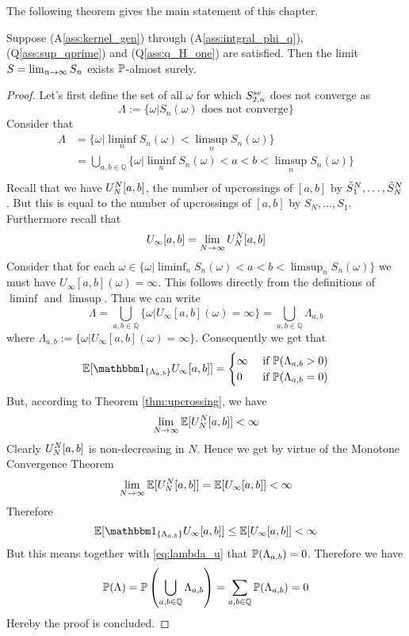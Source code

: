 The following theorem gives the main statement of this chapter. 
\begin{thm}
	\label{thm:existence_limit}
	Suppose (A\ref{ass:kernel_gen}) through (A\ref{ass:intgral_phi_q}), (Q\ref{ass:sup_qprime}) and (Q\ref{ass:q_H_one}) are satisfied. Then the limit
	$S = \lim_{n\to\infty} \sn{n}$
	exists $\P$-almost surely.
	\begin{proof}
		Let's first define the set of all $\omega$ for which $\snse{2}{n}$ does not converge as
		$$\Lambda := \{\omega | S_n(\omega) \textrm{ does not converge}\}$$
		Consider that
		\begin{align*}
			\Lambda &= \{\omega | \liminf_{n}S_n(\omega) < \limsup_{n} S_n(\omega)\}\\
			&= \bigcup_{a,b\in\mathbb{Q}}\{\omega | \liminf_{n}S_n(\omega) < a < b < \limsup_{n} S_n(\omega)\}\\
		\end{align*}
		Recall that we have $\UNab{N}$, the number of upcrossings of $[a,b]$ by $\StN{1}, \dots, \StN{N}$. But this is equal to the number of upcrossings of $[a,b]$ by $S_N, \dots, S_1$. Furthermore recall that 
		$$U_\infty[a,b] = \lim\limits_{N\to\infty} \UNab{N}$$
		Consider that for each $\omega \in \{\omega | \liminf_{n}S_n(\omega) < a < b < \limsup_{n} S_n(\omega)\}$ we must have $U_{\infty}[a,b](\omega) = \infty$. This follows directly from the definitions of $\liminf$ and $\limsup$. Thus we can write
		\begin{equation*}
		\Lambda = \bigcup_{a,b\in\mathbb{Q}}\{ \omega | U_\infty[a,b](\omega) = \infty\} = \bigcup_{a,b\in\mathbb{Q}} \Lambda_{a,b}
		\end{equation*}
		where $\Lambda_{a,b} := \{ \omega | U_\infty[a,b](\omega) = \infty\}$.
		Consequently we get that
		\begin{equation}
			\E[\I{\Lambda_{a,b}} U_\infty[a,b]] = \begin{cases}
			\infty &\textrm{ if } \P(\Lambda_{a,b}>0)\\
			0 &\textrm{ if } \P(\Lambda_{a,b}=0)\\
			\end{cases}
			\label{eq:lambda_u}
		\end{equation}
		But, according to Theorem \ref{thm:upcrossing}, we have
		$$\lim\limits_{N\to\infty}\E[\UNab{N}]<\infty$$
		Clearly $\UNab{N}$ is non-decreasing in $N$. Hence we get by virtue of the Monotone Convergence Theorem 
		$$\lim\limits_{N\to\infty}\E[\UNab{N}] = \E[U_\infty[a,b]] <\infty$$	
		Therefore 
		$$\E[\I{\Lambda_{a,b}} U_\infty[a,b]] \leq \E[U_\infty[a,b]] < \infty$$
		But this means together with \eqref{eq:lambda_u} that $\P(\Lambda_{a,b}) = 0$. Therefore we have
		\begin{equation*}
			\P(\Lambda) = \P\left(\bigcup_{a,b\in\mathbb{Q}}\Lambda_{a,b}\right) = \sum_{a,b \in \mathbb{Q}} \P(\Lambda_{a,b}) = 0
		\end{equation*}
		Hereby the proof is concluded.
	\end{proof}
\end{thm}


